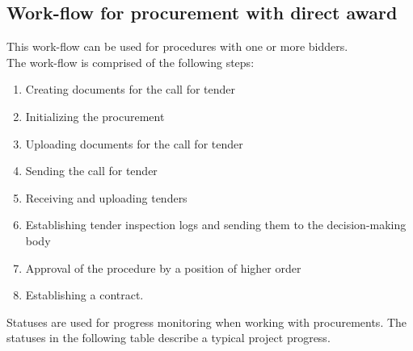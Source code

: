 \subsection{Work-flow for procurement with direct award}

This work-flow can be used for procedures with one or more bidders. \\
The work-flow is comprised of the following steps:

\begin{enumerate}
\item Creating documents for the call for tender
\item Initializing the procurement
\item Uploading documents for the call for tender
\item Sending the call for tender
\item Receiving and uploading tenders
\item Establishing tender inspection logs and sending them to the decision-making body
\item Approval of the procedure by a position of higher order
\item Establishing a contract.
\end{enumerate}

Statuses are used for progress monitoring when working with procurements. The statuses in the following table describe a typical project progress.

\vspace{\baselineskip}

